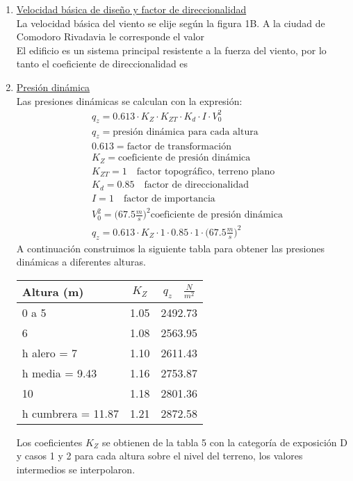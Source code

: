 \begin{enumerate}
\item \underline{Velocidad básica de diseño y factor de direccionalidad}\\
La velocidad básica del viento se elije según la figura 1B. A la ciudad de Comodoro Rivadavia le corresponde el valor  \\
El edificio es un sistema principal resistente a la fuerza del viento, por lo tanto el coeficiente de direccionalidad es 

\item \underline{Presión dinámica}\\
Las presiones dinámicas se calculan con la expresión:
\begin{align*}
& q_z=0.613 \cdot K_Z \cdot K_{ZT} \cdot K_d \cdot I \cdot V_0^2 \\
& q_z = \text{presión dinámica para cada altura} \\
& 0.613 = \text{factor de transformación} \\
& K_Z = \text{coeficiente de presión dinámica} \\
& K_{ZT} = 1 \quad\text{factor topográfico, terreno plano} \\
& K_d = 0.85 \quad\text{factor de direccionalidad} \\
& I = 1 \quad\text{factor de importancia} \\
& V_0^2 =\bigg(67.5 \frac{m}{s}\bigg)^2\text{coeficiente de presión dinámica} \\
& q_z=0.613 \cdot K_Z \cdot 1 \cdot 0.85 \cdot 1 \cdot \bigg(67.5 \frac{m}{s}\bigg)^2
\end{align*}
A continuación construimos la siguiente tabla para obtener las presiones dinámicas a diferentes alturas.

\begin{table}[H]
  \begin{center}
    \begin{tabular}{l|c|c} %
      Altura (m) & $K_Z$ & $q_z \quad\frac{N}{m^2}$\\
      \hline
      0 a 5 & 1.05 & 2492.73\\
      6 & 1.08 & 2563.95\\
      h alero = 7 & 1.10 & 2611.43\\
      h media = 9.43 & 1.16 & 2753.87\\
      10 & 1.18 & 2801.36\\
      h cumbrera = 11.87 & 1.21 & 2872.58\\
    \end{tabular}
  \end{center}
\end{table}
Los coeficientes $K_Z$ se obtienen de la tabla 5 con la categoría de exposición D y casos 1 y 2 para cada altura sobre el nivel del terreno, los valores intermedios se interpolaron.


\end{enumerate}
